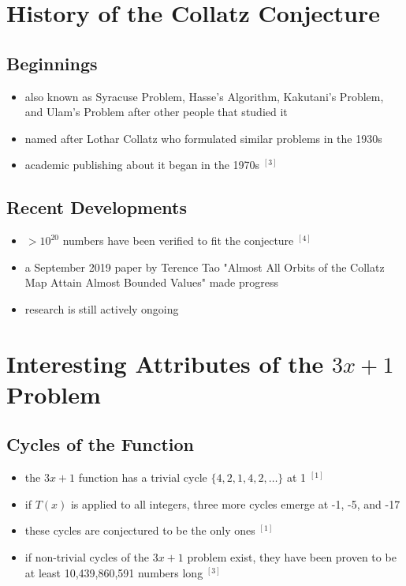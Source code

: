 \documentclass[12pt, a4paper, reqno]{amsart}
\begin{document}
\section{History of the Collatz Conjecture}

\subsection{Beginnings}

\begin{itemize}
    \item also known as Syracuse Problem, Hasse's Algorithm, Kakutani's 
        Problem, and Ulam's Problem after other people that studied it
    \item named after Lothar Collatz who formulated similar problems in the 
        1930s
    \item academic publishing about it began in the 1970s $^{[3]}$
\end{itemize}

\subsection{Recent Developments}

\begin{itemize}
    \item $>10^{20}$ numbers have been verified to fit the conjecture $^{[4]}$
    \item a September 2019 paper by Terence Tao "Almost All Orbits of the 
        Collatz Map Attain Almost Bounded Values" made progress
    \item research is still actively ongoing
\end{itemize}

\section{Interesting Attributes of the $3x+1$ Problem}

\subsection{Cycles of the Function}

\begin{itemize}
    \item the $3x+1$ function has a trivial cycle $\{4,2,1,4,2,\dots\}$ at 1 $^{[1]}$
    \item if $T(x)$ is applied to all integers, three more cycles emerge at -1, -5, and -17
    \item these cycles are conjectured to be the only ones $^{[1]}$
    \item if non-trivial cycles of the $3x+1$ problem exist, they have been 
        proven to be at least 10,439,860,591 numbers long $^{[3]}$
\end{itemize}
\end{document}
